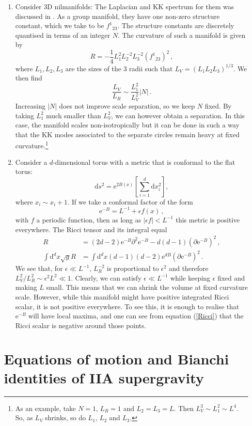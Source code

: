 \documentclass[11pt]{article}
\newcommand{\be}{\begin{equation}}
\newcommand{\ee}{\end{equation}}
\def\be{\begin{equation}}
\def\ee{\end{equation}}
\renewcommand{\[}{\left[}
\renewcommand{\]}{\right]}
\renewcommand{\(}{\left(}
\renewcommand{\)}{\right)}
\renewcommand{\d}{\textrm{d}}
\newcommand{\e}{\textrm{e}}
\newcommand{\<}{\langle}
\renewcommand{\>}{\rangle}
\begin{document}
\begin{enumerate}
\item   Consider 3D nilmanifolds: The Laplacian and KK spectrum for them was discussed in \cite{Andriot:2016rdd, Andriot:2018tmb}.  As a group manifold, they have one non-zero structure constant, which we take to be $f^{1}{}_{23}$. The structure constants are discretely quantised in terms of an integer $N$. The curvature of such a manifold is given by
\be
R = - \frac{1}{4}L_1^2L_2^{-2}L_3^{-2}(f^{1}{}_{23})^2\,,
\ee
where $L_1,L_2,L_3$ are the sizes of the 3 radii such that $L_{V} = (L_1L_2L_3)^{1/3}$. We then find
\be
\frac{L_{V}}{L_R}  \sim \frac{L_1^2}{L_V^2}|N|\,.
\ee
Increasing $|N|$ does not improve scale separation, so we keep $N$ fixed.  By taking $L_1^2$ much smaller than $L^2_V$, we can however obtain a separation. In this case, the manifold scales non-isotropically but it can be done in such a way that the KK modes associated to the separate circles remain heavy at fixed curvature.\footnote{As an example, take $N=1$, $L_R=1$ and $L_2=L_3=L$. Then  $L_V^3\sim L_1^2\sim L^4$. So, as $L_V$ shrinks, so do $L_1$, $L_2$ and $L_3$.  } 
\item Consider a $d$-dimensional torus with a metric that is conformal to the flat torus:
\be
\d s^2 =  \e^{2B(x)}\left[\sum_{i=1}^d\d x_i^2\right],
\ee
where $x_i\sim x_i+1$. If we take a conformal factor of the form
\be
\e^{-B} =  L^{-1} + \epsilon f(x)\,, 
\ee
with $f$ a periodic function, then as long as $|\epsilon f| < L^{-1}$ this metric is positive everywhere. The Ricci tensor and its integral equal
\begin{align} 
R &=  (2d-2)\e^{-B}\partial^2 \e^{-B}  - d (d-1)(\partial \e^{-B})^2\,, \label{Ricci}\\
\int \d^dx \sqrt{g}R &= \int \d^dx (d-1)(d-2)\e^{dB}(\partial \e^{-B})^2\,. \label{Ricci2}
\end{align}
We see that, for $\epsilon \ll L^{-1}$, $L_R^{-2}$ is proportional to $\epsilon^2$ and therefore $L_V^2/L_R^2\sim \epsilon^2L^2 \ll 1$.
Clearly, we can satisfy $\epsilon \ll L^{-1}$ while keeping $\epsilon$ fixed and making $L$ small. This means that we can shrink the volume at fixed curvature scale. However, while this manifold might have positive integrated Ricci scalar, it is not positive everywhere. To see this, it is enough to realise that $\e^{-B}$ will have local maxima, and one can see from equation (\ref{Ricci}) that the Ricci scalar is negative around those points.
\end{enumerate}


\section{Equations of motion and Bianchi identities of IIA supergravity}
\label{appEOM}
\end{document}
